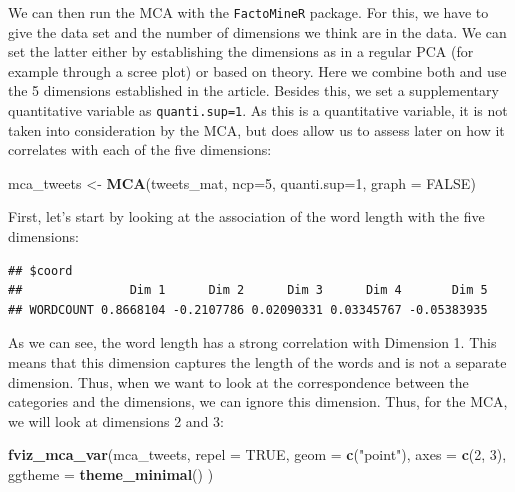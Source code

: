 \documentclass[
]{book}
\newenvironment{Shaded}{\begin{snugshade}}{\end{snugshade}}
\newcommand{\AttributeTok}[1]{\textcolor[rgb]{0.13,0.29,0.53}{#1}}
\newcommand{\ConstantTok}[1]{\textcolor[rgb]{0.56,0.35,0.01}{#1}}
\newcommand{\DecValTok}[1]{\textcolor[rgb]{0.00,0.00,0.81}{#1}}
\newcommand{\FunctionTok}[1]{\textcolor[rgb]{0.13,0.29,0.53}{\textbf{#1}}}
\newcommand{\NormalTok}[1]{#1}
\newcommand{\OtherTok}[1]{\textcolor[rgb]{0.56,0.35,0.01}{#1}}
\newcommand{\SpecialCharTok}[1]{\textcolor[rgb]{0.81,0.36,0.00}{\textbf{#1}}}
\newcommand{\StringTok}[1]{\textcolor[rgb]{0.31,0.60,0.02}{#1}}
\begin{document}
We can then run the MCA with the \texttt{FactoMineR} package. For this, we have to give the data set and the number of dimensions we think are in the data. We can set the latter either by establishing the dimensions as in a regular PCA (for example through a scree plot) or based on theory. Here we combine both and use the 5 dimensions established in the article. Besides this, we set a supplementary quantitative variable as \texttt{quanti.sup=1}. As this is a quantitative variable, it is not taken into consideration by the MCA, but does allow us to assess later on how it correlates with each of the five dimensions:

\begin{Shaded}
\begin{Highlighting}[]
\NormalTok{mca\_tweets }\OtherTok{\textless{}{-}} \FunctionTok{MCA}\NormalTok{(tweets\_mat, }\AttributeTok{ncp=}\DecValTok{5}\NormalTok{, }\AttributeTok{quanti.sup=}\DecValTok{1}\NormalTok{, }\AttributeTok{graph =} \ConstantTok{FALSE}\NormalTok{)}
\end{Highlighting}
\end{Shaded}

First, let's start by looking at the association of the word length with the five dimensions:

\begin{Shaded}
\end{Shaded}

\begin{verbatim}
## $coord
##               Dim 1      Dim 2      Dim 3      Dim 4       Dim 5
## WORDCOUNT 0.8668104 -0.2107786 0.02090331 0.03345767 -0.05383935
\end{verbatim}

As we can see, the word length has a strong correlation with Dimension 1. This means that this dimension captures the length of the words and is not a separate dimension. Thus, when we want to look at the correspondence between the categories and the dimensions, we can ignore this dimension. Thus, for the MCA, we will look at dimensions 2 and 3:

\begin{Shaded}
\begin{Highlighting}[]
\FunctionTok{fviz\_mca\_var}\NormalTok{(mca\_tweets,}
             \AttributeTok{repel =} \ConstantTok{TRUE}\NormalTok{,}
             \AttributeTok{geom =} \FunctionTok{c}\NormalTok{(}\StringTok{"point"}\NormalTok{),}
             \AttributeTok{axes =} \FunctionTok{c}\NormalTok{(}\DecValTok{2}\NormalTok{, }\DecValTok{3}\NormalTok{),}
             \AttributeTok{ggtheme =} \FunctionTok{theme\_minimal}\NormalTok{()}
\NormalTok{             )}
\end{Highlighting}
\end{Shaded}
\end{document}
